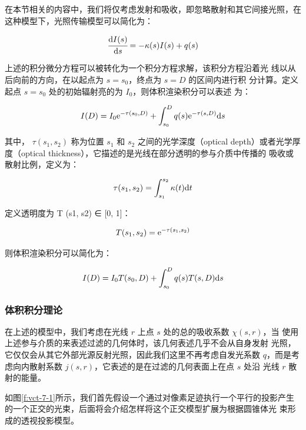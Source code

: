在本节相关的内容中，我们将仅考虑发射和吸收，即忽略散射和其它间接光照，在这种模型下，光照传输模型可以简化为：

\begin{equation}
	\cfrac{{\rm d}I(s)}{{\rm d}s}=-\kappa(s)I(s)+q(s)
\end{equation}

上述的积分微分方程可以被转化为一个积分方程求解，该积分方程沿着光 线以从后向前的方向，在以起点为 $s = s_0$，终点为 $s = D$ 的区间内进行积 分计算。定义起点 $s = s_0$ 处的初始辐射亮的为 $I_0$，则体积渲染积分可以表述 为\cite{b:Real-timeVolumeGraphics}：

\begin{equation}
	I(D)=I_0 {\rm e}^{-\tau(s_0,D)}+\int^{D}_{s_0}q(s){\rm e}^{-\tau(s,D)}{\rm d}s
\end{equation}

\noindent 其中， $\tau(s_1,s_2)$ 称为位置 $s_1$ 和 $s_2$ 之间的光学深度（optical depth）或者光学厚度（optical thickness），它描述的是光线在部分透明的参与介质中传播的 吸收或散射比例，定义为：

\begin{equation}
	\tau(s_1,s_2)=\int^{s_2}_{s_1}\kappa(t){\rm d}t
\end{equation}

\noindent 定义透明度为 T (s1, s2) ∈ [0, 1]：

\begin{equation}
	T(s_1,s_2)={\rm e}^{-\tau(s_1,s_2)}
\end{equation}

\noindent 则体积渲染积分可以简化为：

\begin{equation}
	I(D)=I_0T(s_0,D)+\int^{D}_{s_0}q(s)T(s,D){\rm d}s
\end{equation}




\subsubsection{体积积分理论}
在上述的模型中，我们考虑在光线 $r$ 上点 $s$ 处的总的吸收系数 $\chi (s, r)$，当 使用上述参与介质的来表述过滤的几何体时，该几何表述几乎不会从自身发射 光照，它仅仅会从其它外部光源反射光照，因此我们这里不再考虑自发光系数 $q$，而是考虑向内散射系数 $j(s, r)$，它表述的是在过滤的几何表面上在点 $s$ 处沿 光线 $r$ 散射的能量。

如图\ref{f:vct-7-1}所示，我们首先假设一个通过对像素足迹执行一个平行的投影产生的一个正交的光束，后面将会介绍怎样将这个正交模型扩展为根据圆锥体光 束形成的透视投影模型。

